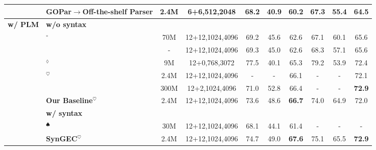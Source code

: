 \documentclass[11pt]{article}
\begin{document}
\begin{table*}[tp!]
{\begin{tabular}{clcccccccc}
                                   & \hspace{0.3cm}\textbf{GOPar$\rightarrow$Off-the-shelf Parser}&   2.4M &   6+6,512,2048  & 68.2          & 40.9       & 60.2           & 67.3       & 55.4       & 64.5          \\\hline \hline
\multirow{12}{*}{\textbf{w/ PLM}}  & \multicolumn{9}{l}{\textbf{w/o syntax}}                                                                  \\
                                    & \citet{kaneko2020encoder}$^{\circ}$&   70M &   12+12,1024,4096            & 69.2          & 45.6       & 62.6          & 67.1       & 60.1       & 65.6          \\
                                  & \citet{katsumata2020stronger}&   - &   12+12,1024,4096              & 69.3          & 45.0       & 62.6          & 68.3       & 57.1       & 65.6          \\
                                  & \citet{omelianchuk2020gector}$^{\lozenge}$&   9M &   12+0,768,3072            & 77.5          & 40.1       & 65.3          & 79.2       & 53.9       & 72.4          \\
                                   & \citet{rothe2021recipe}$^{\heartsuit}$&   2.4M &   12+12,1024,4096            & -             & -          & 66.1         & -          & -          & 72.1          \\
                                  & \citet{DBLP:conf/acl/SunGWW20}&   300M &   12+2,1024,4096            & 71.0             & 52.8          & 66.4         & -          & -          & \textbf{72.9}          \\
                                    & \textbf{Our Baseline}$^{\heartsuit}$&   2.4M &   12+12,1024,4096 &  73.6          & 	48.6      & 	\textbf{66.7}         & 74.0       & 64.9       & 72.0          \\ 
                                  \cline{2-10} 
                                  & \multicolumn{9}{l}{\textbf{w/ syntax}}                                                                   \\ 
                                & \citet{li2022syntax}$^{\spadesuit}$&   30M &   12+12,1024,4096               & 68.1 &  44.1  & 61.4          & -       & -       & -          \\
                                  & \textbf{SynGEC}$^{\heartsuit}$&   2.4M  &   12+12,1024,4096 & 74.7 & 49.0      & \textbf{67.6}          & 75.1      & 65.5      & \textbf{72.9}          \\ 

\end{tabular}}
\end{table*}
\end{document}
